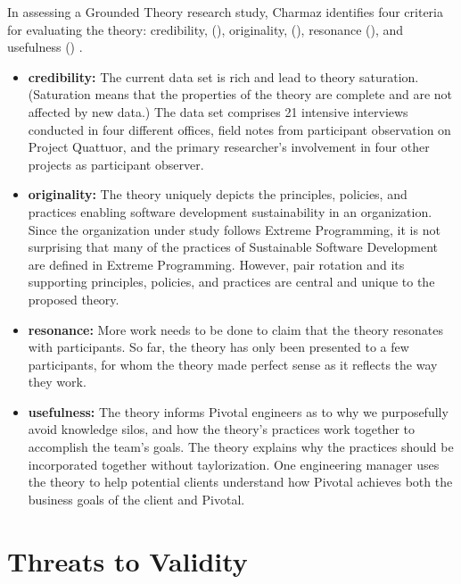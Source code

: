 \begin{table}[]
In assessing a Grounded Theory research study, Charmaz identifies four criteria for evaluating the theory: credibility, (), originality, (), resonance (), and usefulness () \cite{StolGTinSE}. 

\begin{itemize}
\item 
\textbf{credibility:}  The current data set is rich and lead to theory saturation. (Saturation means that the properties of the theory are complete and are not affected by new data.) The data set comprises 21 intensive interviews conducted in four different offices,  field notes from participant observation on Project Quattuor, and the primary researcher's involvement in four other projects as participant observer.

\item
\textbf{originality:} The theory uniquely depicts the principles, policies, and practices enabling software development sustainability in an organization. Since the organization under study follows Extreme Programming, it is not surprising that many of the practices of Sustainable Software Development are defined in Extreme Programming. However, pair rotation and its supporting principles, policies, and practices are central and unique to the proposed theory.

\item
\textbf{resonance:} More work needs to be done to claim that the theory resonates with participants. So far, the theory has only been presented to a few participants, for whom the theory made perfect sense as it reflects the way they work. 

\item
\textbf{usefulness:}  The theory informs Pivotal engineers as to why we purposefully avoid knowledge silos, and how the theory's practices work together to accomplish the team's goals.  The theory explains why the practices should be incorporated together without taylorization. One engineering manager uses the theory to help potential clients understand how Pivotal  achieves both the business goals of the client and Pivotal.

\end{itemize}

\section{Threats to Validity}


\end{table}
